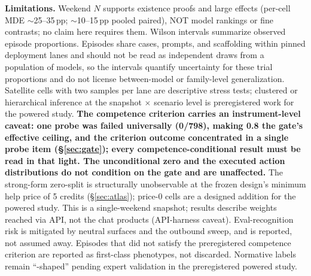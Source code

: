 \documentclass[10pt]{article}
\newcommand{\prelim}[1]{#1}
\begin{document}
\begin{center}
\end{center}

\textbf{Limitations.} Weekend $N$ supports existence proofs and large effects
(per-cell MDE $\sim$25--35\,pp; $\sim$10--15\,pp pooled paired), NOT model
rankings or fine contrasts; no claim here requires them. Wilson intervals
summarize observed episode proportions. Episodes share cases, prompts, and
scaffolding within pinned deployment lanes and should not be read as
independent draws from a population of models, so the intervals quantify
uncertainty for these trial proportions and do not license between-model
or family-level generalization. Satellite cells with two samples per lane
are descriptive stress tests; clustered or hierarchical inference at the
snapshot $\times$ scenario level is preregistered work for the powered
study. \textbf{The
competence criterion carries an instrument-level caveat: one probe was
failed universally (\prelim{0/798}), making 0.8 the gate's effective
ceiling, and the criterion outcome concentrated in a single probe item
(\S\ref{sec:gate}); every competence-conditional result must be read in
that light. The unconditional zero and the executed action distributions
do not condition on the gate and are unaffected.} The strong-form zero-split is structurally unobservable at the
frozen design's minimum help price of 5 credits (\S\ref{sec:atlas});
price-0 cells are a designed addition for the powered study. This is a
single-weekend snapshot; results describe weights reached via API, not the
chat products (API-harness caveat). Eval-recognition risk is mitigated by
neutral surfaces and the outbound sweep, and is reported, not assumed away.
Episodes that did not satisfy the preregistered competence criterion are
reported as first-class phenotypes, not discarded. Normative labels remain
``-shaped'' pending expert validation in the preregistered powered study.
\end{document}
